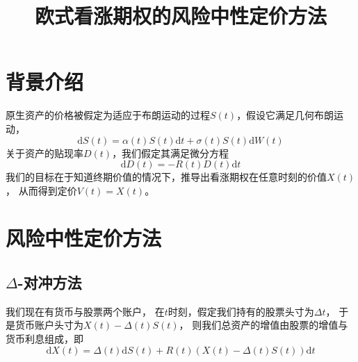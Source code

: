 \documentclass{ctexart}
\title{欧式看涨期权的风险中性定价方法}
\date{}
\def\diff{\mathrm{d}}
\begin{document}
    \maketitle

    \section{背景介绍}
    原生资产的价格被假定为适应于布朗运动的过程$S(t)$，假设它满足几何布朗运动，
    \begin{equation}
        \label{eq:stock price}
        \diff S(t)=\alpha(t)S(t)\diff t+\sigma(t)S(t)\diff W(t)
    \end{equation}
    关于资产的贴现率$D(t)$，我们假定其满足微分方程
    \begin{equation}
        \label{eq:discount}
        \diff D(t)=-R(t)D(t)\diff t
    \end{equation}
    我们的目标在于知道终期价值的情况下，推导出看涨期权在任意时刻的价值$X(t)$，
    从而得到定价$V(t)=X(t)$。

    \section{风险中性定价方法}
    \subsection{$\Delta$-对冲方法}
    我们现在有货币与股票两个账户，
    在$t$时刻，假定我们持有的股票头寸为$\Delta t$，
    于是货币账户头寸为$X(t)-\Delta(t)S(t)$，
    则我们总资产的增值由股票的增值与货币利息组成，即
    \begin{equation}
        \label{eq:asset value}        
        \diff X(t)=\Delta(t)\diff S(t)+R(t)(X(t)-\Delta(t)S(t))\diff t
    \end{equation}
\end{document}
